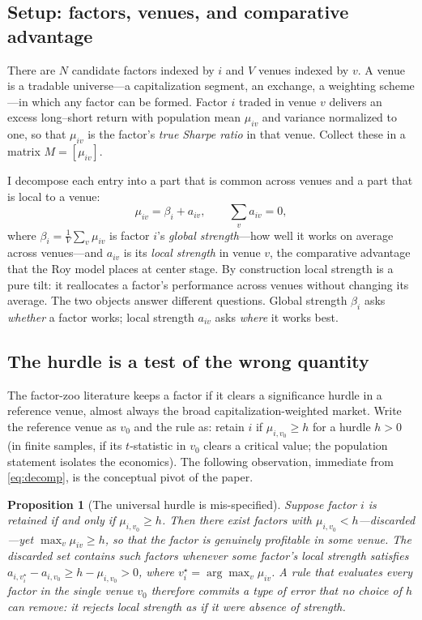 \documentclass[12pt]{article}
\theoremstyle{plain}
\newtheorem{proposition}{Proposition}
\theoremstyle{definition}
\begin{document}
\subsection{Setup: factors, venues, and comparative advantage}

There are $N$ candidate factors indexed by $i$ and $V$ venues indexed by $v$. A
venue is a tradable universe---a capitalization segment, an exchange, a weighting
scheme---in which any factor can be formed. Factor $i$ traded in venue $v$
delivers an excess long--short return with population mean $\mu_{iv}$ and
variance normalized to one, so that $\mu_{iv}$ is the factor's \emph{true
Sharpe ratio} in that venue. Collect these in a matrix $M=[\mu_{iv}]$.

I decompose each entry into a part that is common across venues and a part that
is local to a venue:
\begin{equation}
\mu_{iv}=\beta_i+a_{iv},\qquad \sum_{v}a_{iv}=0,
\label{eq:decomp}
\end{equation}
where $\beta_i=\frac1V\sum_v\mu_{iv}$ is factor $i$'s \emph{global strength}---how
well it works on average across venues---and $a_{iv}$ is its \emph{local
strength} in venue $v$, the comparative advantage that the Roy model places at
center stage. By construction local strength is a pure tilt: it reallocates a
factor's performance across venues without changing its average. The two objects
answer different questions. Global strength $\beta_i$ asks \emph{whether} a
factor works; local strength $a_{iv}$ asks \emph{where} it works best.

\subsection{The hurdle is a test of the wrong quantity}

The factor-zoo literature keeps a factor if it clears a significance hurdle in a
reference venue, almost always the broad capitalization-weighted market. Write
the reference venue as $v_0$ and the rule as: retain $i$ if
$\mu_{i,v_0}\ge h$ for a hurdle $h>0$ (in finite samples, if its $t$-statistic in
$v_0$ clears a critical value; the population statement isolates the economics).
The following observation, immediate from \eqref{eq:decomp}, is the conceptual
pivot of the paper.

\begin{proposition}[The universal hurdle is mis-specified]
\label{prop:hurdle}
Suppose factor $i$ is retained if and only if $\mu_{i,v_0}\ge h$. Then there
exist factors with $\mu_{i,v_0}<h$---discarded---yet $\max_v \mu_{iv}\ge h$, so
that the factor is genuinely profitable in some venue. The discarded set
contains such factors whenever some factor's local strength satisfies
$a_{i,v^\star_i}-a_{i,v_0}\ge h-\mu_{i,v_0}>0$, where $v^\star_i=\arg\max_v
\mu_{iv}$. A rule that evaluates every factor in the single venue $v_0$ therefore
commits a type of error that no choice of $h$ can remove: it rejects local
strength as if it were absence of strength.
\end{proposition}
\end{document}
